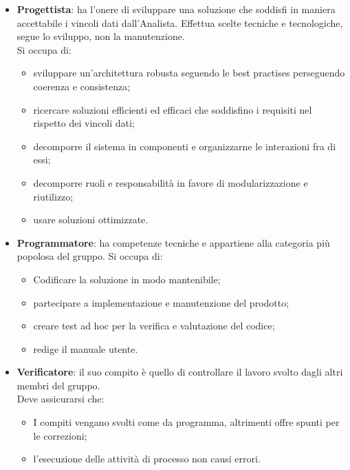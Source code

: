 \begin{itemize}
            Si occupa di:
            \begin{itemize}
                \item mediare fra proponenti/committenti e sviluppatori;
                \item studia le necessità dei proponenti definendo problemi, obiettivi e requisiti soluzione;
                \item etichetta i requisiti in: impliciti/espliciti e opzionali/obbligatori;
                \item redige i file \emph{Studio di fattibilità} e \emph{Analisi dei requisiti}.
            \end{itemize}
            \item \textbf{Progettista}: ha l'onere di sviluppare una soluzione che soddisfi in maniera accettabile i vincoli dati dall'Analista.
            Effettua scelte tecniche e tecnologiche, segue lo sviluppo, non la manutenzione. \\
            Si occupa di:
            \begin{itemize}
                \item sviluppare un'architettura robusta seguendo le best practises perseguendo coerenza e consistenza;
                \item ricercare soluzioni efficienti ed efficaci che soddisfino i requisiti nel rispetto dei vincoli dati;
                \item decomporre il sistema in componenti e organizzarne le interazioni fra di essi;
                \item decomporre ruoli e responsabilità in favore di modularizzazione e riutilizzo;
                \item usare soluzioni ottimizzate.
            \end{itemize}
            \item \textbf{Programmatore}: ha competenze tecniche e appartiene alla categoria pi\`u popolosa del gruppo.
            Si occupa di:
            \begin{itemize}
                \item Codificare la soluzione in modo mantenibile;
                \item partecipare a implementazione e manutenzione del prodotto;
                \item creare test ad hoc per la verifica e valutazione del codice;
                \item redige il manuale utente.
            \end{itemize}
            \item \textbf{Verificatore}: il suo compito \`e quello di controllare il lavoro svolto dagli altri membri del gruppo. \\
            Deve assicurarsi che:
            \begin{itemize}
                \item I compiti vengano svolti come da programma, altrimenti offre spunti per le correzioni;
                \item l'esecuzione delle attivit\`a di processo non causi errori.
            \end{itemize}
        \end{itemize}

